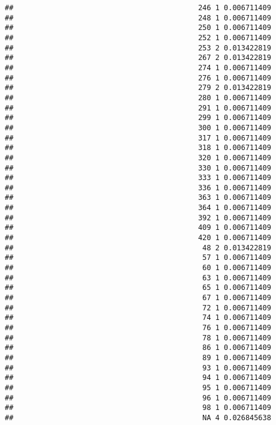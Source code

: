 \documentclass[
]{article}
\begin{document}
\begin{verbatim}
##                                           246 1 0.006711409
##                                           248 1 0.006711409
##                                           250 1 0.006711409
##                                           252 1 0.006711409
##                                           253 2 0.013422819
##                                           267 2 0.013422819
##                                           274 1 0.006711409
##                                           276 1 0.006711409
##                                           279 2 0.013422819
##                                           280 1 0.006711409
##                                           291 1 0.006711409
##                                           299 1 0.006711409
##                                           300 1 0.006711409
##                                           317 1 0.006711409
##                                           318 1 0.006711409
##                                           320 1 0.006711409
##                                           330 1 0.006711409
##                                           333 1 0.006711409
##                                           336 1 0.006711409
##                                           363 1 0.006711409
##                                           364 1 0.006711409
##                                           392 1 0.006711409
##                                           409 1 0.006711409
##                                           420 1 0.006711409
##                                            48 2 0.013422819
##                                            57 1 0.006711409
##                                            60 1 0.006711409
##                                            63 1 0.006711409
##                                            65 1 0.006711409
##                                            67 1 0.006711409
##                                            72 1 0.006711409
##                                            74 1 0.006711409
##                                            76 1 0.006711409
##                                            78 1 0.006711409
##                                            86 1 0.006711409
##                                            89 1 0.006711409
##                                            93 1 0.006711409
##                                            94 1 0.006711409
##                                            95 1 0.006711409
##                                            96 1 0.006711409
##                                            98 1 0.006711409
##                                            NA 4 0.026845638
\end{verbatim}
\end{document}
